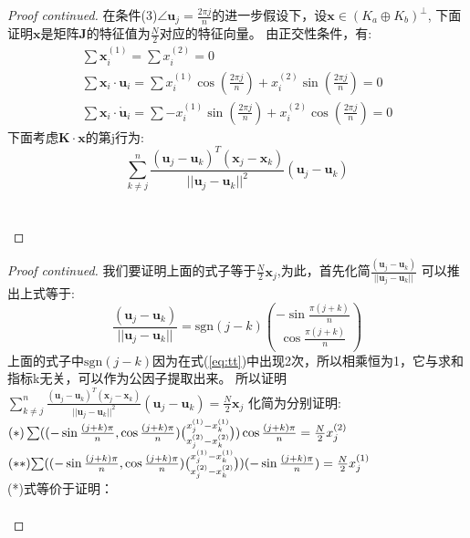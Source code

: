 \begin{proof}[Proof continued]
  在条件(3)$\angle\bm{u}_j=\frac{2\pi j}{n}$的进一步假设下，设$\bm{x}\in (K_a\oplus K_b)^{\bot}$,
  下面证明$\bm{x}$是矩阵$\bm{J}$的特征值为$\frac{N}{2}$对应的特征向量。
  由正交性条件，有:
\begin{eqnarray}
\sum \bm{x}_i^{(1)}=\sum x_i^{(2)}=0\\
\sum \bm{x}_i \cdot \bm{u}_i=\sum x_i^{(1)} \cos(\frac{2\pi j}{n})+x_i^{(2)} \sin(\frac{2\pi j}{n}) =0\label{eq:coupling1}\\
\sum \bm{x}_i \cdot \mathring{\bm{u}}_i=\sum -x_i^{(1)} \sin(\frac{2\pi j}{n})+x_i^{(2)} \cos(\frac{2\pi j}{n}) =0\label{eq:coupling2}
\end{eqnarray}
下面考虑$\bm{K}\cdot \bm{x}$的第j行为:
\begin{equation}\label{eq:tt}
\sum_{k\neq j}^n \frac{(\bm{u}_j-\bm{u}_k)^T(\bm{x}_j-\bm{x}_k)}{||\bm{u}_j-\bm{u}_k||^2}(\bm{u}_j-\bm{u}_k)
\end{equation}
\quad\\
\quad\\
\end{proof}


\begin{proof}[Proof continued]
我们要证明上面的式子等于$\frac{N}{2}\bm{x}_j$,为此，首先化简$\frac{(\bm{u}_j-\bm{u}_k)}{||\bm{u}_j-\bm{u}_k||}$
可以推出上式等于:
\begin{equation}
\frac{(\bm{u}_j-\bm{u}_k)}{||\bm{u}_j-\bm{u}_k||}=\text{sgn}(j-k)\binom{-\sin\frac{\pi(j+k)}{n}}{\cos\frac{\pi(j+k)}{n}}
\end{equation}
上面的式子中$\text{sgn}(j-k)$因为在式(\ref{eq:tt})中出现2次，所以相乘恒为1，它与求和指标k无关，可以作为公因子提取出来。
所以证明
$\sum_{k\neq j}^n \frac{(\bm{u}_j-\bm{u}_k)^T(\bm{x}_j-\bm{x}_k)}{||\bm{u}_j-\bm{u}_k||^2}(\bm{u}_j-\bm{u}_k)=\frac{N}{2}\bm{x}_j
$
化简为分别证明:
$\scriptsize{
(*)\sum ((-\sin\frac{(j+k)\pi}{n},\cos\frac{(j+k)\pi}{n})\binom{x_j^{(1)}-x_k^{(1)}}{x_j^{(2)}-x_k^{(2)}})
\cos\frac{(j+k)\pi}{n}=\frac{N}{2}x_j^{(2)}}$
$(**)\scriptsize{\sum ((-\sin\frac{(j+k)\pi}{n},\cos\frac{(j+k)\pi}{n})\binom{x_j^{(1)}-x_k^{(1)}}{x_j^{(2)}-x_k^{(2)}})
(-\sin\frac{(j+k)\pi}{n})=\frac{N}{2}x_j^{(1)}}$\\
(*)式等价于证明：\\
\quad\\
\end{proof}


